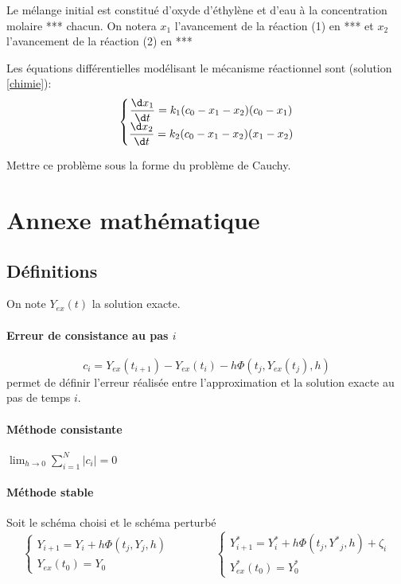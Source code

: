 \documentclass[10pt]{article}
\begin{document}
Le mélange initial est constitué d'oxyde d'éthylène et d'eau à la concentration molaire ***%
chacun. On notera $x_1$ l'avancement de la réaction (1) en ***%
 et $x_2$ l'avancement de la réaction (2) en ***%

Les équations différentielles modélisant le mécanisme réactionnel sont (solution \ref{chimie}):
\[ \left\{ \begin{matrix}
\dfrac{\d x_1}{\d t} = k_1 (c_0-x_1-x_2)(c_0-x_1) \\
\dfrac{\d x_2}{\d t} = k_2 (c_0-x_1-x_2)(x_1-x_2) 
\end{matrix}\right.\]

  {Mettre ce problème sous la forme du problème de Cauchy.}


\section{Annexe mathématique}
\subsection{Définitions}
On note $  {Y}_{ex}(t)$ la solution exacte.

\paragraph{Erreur de consistance au pas $i$} \[c_i =   {Y}_{ex}(t_{i+1})-  {Y}_{ex}(t_i)-h  {\Phi}( t_j,  {Y}_{ex}(t_j),h)\]
permet de définir l'erreur réalisée entre l'approximation et la solution exacte au pas de temps $i$.

\paragraph{Méthode consistante} \hfill$\displaystyle\lim_{h\to 0} \sum_{i=1}^N|c_i| = 0$\hfill ~


\paragraph{Méthode stable} Soit le schéma choisi et le schéma perturbé \[ \displaystyle \left\{\begin{matrix}
  {Y}_{i+1} =   {Y}_{i} +  h  {\Phi}( t_j,  {Y}_j,h)\\
  {Y}_{ex}(t_0)=  {Y_0}
\end{matrix}\right. \qquad\qquad
\displaystyle \left\{\begin{matrix}
  {Y}^*_{i+1} =   {Y}^*_{i} +  h  {\Phi}( t_j,  {Y^*}_j,h) + \zeta_i\\
  {Y}_{ex}^*(t_0)=  {Y}^*_0
\end{matrix}\right.
\]
\end{document}
